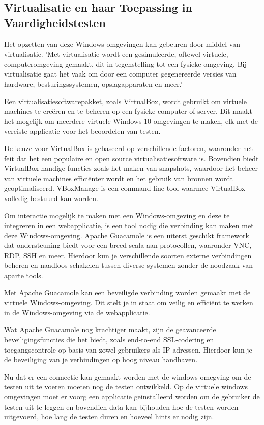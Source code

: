 \subsection{Virtualisatie en haar Toepassing in Vaardigheidstesten}
Het opzetten van deze Windows-omgevingen kan gebeuren door middel van virtualisatie. 'Met virtualisatie wordt een gesimuleerde, oftewel virtuele, computeromgeving gemaakt, dit in tegenstelling tot een fysieke omgeving. Bij virtualisatie gaat het vaak om door een computer gegenereerde versies van hardware, besturingssystemen, opslagapparaten en meer.'\autocite{MicrosoftVirtualisationDefinition}

Een virtualisatiesoftwarepakket, zoals VirtualBox, wordt gebruikt om virtuele machines te creëren en te beheren op een fysieke computer of server. Dit maakt het mogelijk om meerdere virtuele Windows 10-omgevingen te maken, elk met de vereiste applicatie voor het beoordelen van testen.

De keuze voor VirtualBox is gebaseerd op verschillende factoren, waaronder het feit dat het een populaire en open source virtualisatiesoftware is. Bovendien biedt VirtualBox handige functies zoals het maken van snapshots, waardoor het beheer van virtuele machines efficiënter wordt en het gebruik van bronnen wordt geoptimaliseerd. VBoxManage is een command-line tool waarmee VirtualBox volledig bestuurd kan worden.


Om interactie mogelijk te maken met een Windows-omgeving en deze te integreren in een webapplicatie, is een tool nodig die verbinding kan maken met deze Windows-omgeving. Apache Guacamole is een uiterst geschikt framework dat ondersteuning biedt voor een breed scala aan protocollen, waaronder VNC, RDP, SSH en meer. Hierdoor kun je verschillende soorten externe verbindingen beheren en naadloos schakelen tussen diverse systemen zonder de noodzaak van aparte tools.

Met Apache Guacamole kan een beveiligde verbinding worden gemaakt met de virtuele Windows-omgeving. Dit stelt je in staat om veilig en efficiënt te werken in de Windows-omgeving via de webapplicatie.

Wat Apache Guacamole nog krachtiger maakt, zijn de geavanceerde beveiligingsfuncties die het biedt, zoals end-to-end SSL-codering en toegangscontrole op basis van zowel gebruikers als IP-adressen. Hierdoor kun je de beveiliging van je verbindingen op hoog niveau handhaven. ~\autocite{ApacheGuacamole}

Nu dat er een connectie kan gemaakt worden met de windows-omegving om de testen uit te voeren moeten nog de testen ontwikkeld. Op de virtuele windows omgevingen moet er voorg een applicatie geinstalleerd worden om de gebruiker de testen uit te leggen en bovendien data kan bijhouden hoe de testen worden uitgevoerd, hoe lang de testen duren en hoeveel hints er nodig zijn. %

